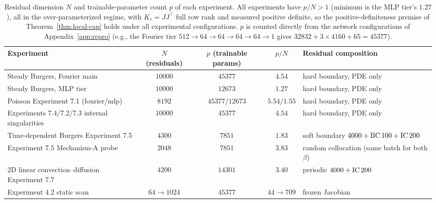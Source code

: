 \documentclass[11pt]{article}
\numberwithin{equation}{section}
\begin{document}
\begin{table}[ht]\centering\small\renewcommand{\arraystretch}{1.2}\setlength{\tabcolsep}{4pt}
\begin{tabular}{p{3.4cm}cccp{3.4cm}}
\toprule
Experiment & $N$ (residuals) & $p$ (trainable params) & $p/N$ & Residual composition\\
\midrule
Steady Burgers, Fourier main & $10000$ & $45377$ & $4.54$ & hard boundary, PDE only\\
Steady Burgers, MLP tier & $10000$ & $12673$ & $1.27$ & hard boundary, PDE only\\
Poisson Experiment 7.1 (fourier/mlp) & $8192$ & $45377/12673$ & $5.54/1.55$ & hard boundary, PDE only\\
Experiments 7.4/7.2/7.3 internal singularities & $10000$ & $45377$ & $4.54$ & hard boundary, PDE only\\
Time-dependent Burgers Experiment 7.5 & $4300$ & $7851$ & $1.83$ & soft boundary $4000+{\rm BC}\,100+{\rm IC}\,200$\\
Experiment 7.5 Mechanism-A probe & $2048$ & $7851$ & $3.83$ & random collocation (same batch for both $\beta$)\\
2D linear convection--diffusion Experiment 7.7 & $4200$ & $14301$ & $3.40$ & periodic $4000+{\rm IC}\,200$\\
Experiment 4.2 static scan & $64\to1024$ & $45377$ & $44\to709$ & frozen Jacobian\\
\bottomrule
\end{tabular}
\caption{Residual dimension $N$ and trainable-parameter count $p$ of each experiment. All experiments have $p/N>1$ (minimum is the MLP tier's $1.27$), all in the over-parameterized regime, with $K_r=JJ^\top$ full row rank and measured positive definite, so the positive-definiteness premise of Theorem~\ref{thm:local-cap} holds under all experimental configurations. $p$ is counted directly from the network configurations of Appendix~\ref{app:repro} (e.g., the Fourier tier $512\to64\to64\to64\to64\to1$ gives $32832+3\times4160+65=45377$).}\label{tab:np}
\end{table}
\end{document}
